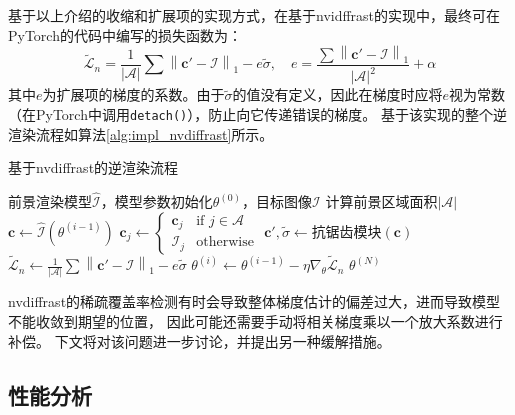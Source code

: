 基于以上介绍的收缩和扩展项的实现方式，在基于nvidffrast的实现中，最终可在PyTorch的代码中编写的损失函数为：
\begin{equation}
\tilde{\mathcal{L}}_n = \frac{1}{|\mathcal{A}|} \sum \left\| \mathbf{c}' - \mathcal{I} \right\|_1 - e \tilde{\sigma},
\quad e = \frac{\sum\left\| \mathbf{c}' - \mathcal{I} \right\|_1}{|\mathcal{A}|^2}+\alpha
\label{eq:loss_n_impl}
\end{equation}
其中$e$为扩展项的梯度的系数。由于$\tilde{\sigma}$的值没有定义，因此在梯度时应将$e$视为常数（在PyTorch中调用\texttt{detach()}），防止向它传递错误的梯度。
基于该实现的整个逆渲染流程如算法\ref{alg:impl_nvdiffrast}所示。
\begin{algorithm}[t]
    \caption{基于nvdiffrast的逆渲染流程}
    \label{alg:impl_nvdiffrast}
    \begin{algorithmic}[1]
        \Require 前景渲染模型$\hat{\mathcal{I}}$，模型参数初始化$\theta^{(0)}$，目标图像$\mathcal{I}$
            \State 计算前景区域面积$|\mathcal{A}|$
                \State $\mathbf{c} \gets \hat{\mathcal{I}}\left(\theta^{(i-1)}\right)$
                \State $\mathbf{c}_j \gets \begin{cases} \mathbf{c}_j &\text{if } j\in\mathcal{A} \\ \mathcal{I}_j &\text{otherwise} \end{cases}$
                \State $\mathbf{c}', \tilde{\sigma} \gets \text{抗锯齿模块}(\mathbf{c})$
                \State $\tilde{\mathcal{L}}_n \gets \frac{1}{|\mathcal{A}|} \sum \left\| \mathbf{c}' - \mathcal{I} \right\|_1 - e \tilde{\sigma}$
                \State $\theta^{(i)} \gets \theta^{(i-1)} - \eta \nabla_{\theta} \tilde{\mathcal{L}}_n$
            \EndFor
            \State \Return $\theta^{(N)}$
        \EndProcedure
    \end{algorithmic}
\end{algorithm}

nvdiffrast的稀疏覆盖率检测有时会导致整体梯度估计的偏差过大，进而导致模型不能收敛到期望的位置，
因此可能还需要手动将相关梯度乘以一个放大系数进行补偿。
下文将对该问题进一步讨论，并提出另一种缓解措施。

\subsection{性能分析}

